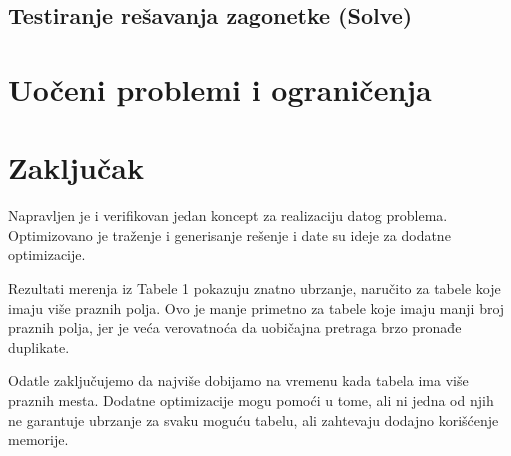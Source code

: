 \documentclass[a4paper]{article}
\begin{document}
    \subsection{Testiranje rešavanja zagonetke (Solve)}

    \newpage
    \section{Uočeni problemi i ograničenja}
    \newpage
    \section{Zaključak}
    Napravljen je i verifikovan jedan koncept za realizaciju datog problema. Optimizovano je traženje i generisanje rešenje i date su ideje za 
    dodatne optimizacije. 
    \par Rezultati merenja iz Tabele 1 pokazuju znatno ubrzanje, naručito za tabele koje imaju više praznih polja. Ovo je manje primetno za tabele koje imaju 
    manji broj praznih polja, jer je veća verovatnoća da uobičajna pretraga brzo pronađe duplikate. 
    \par Odatle zaključujemo da najviše dobijamo na vremenu kada tabela ima više praznih mesta. Dodatne optimizacije mogu pomoći u tome, ali ni jedna od njih ne 
    garantuje ubrzanje za svaku moguću tabelu, ali zahtevaju dodajno korišćenje memorije.
    \newpage
\end{document}
